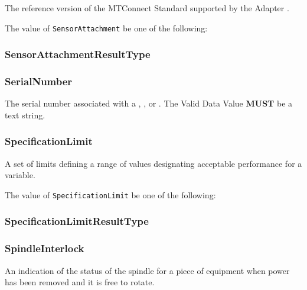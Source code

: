 The reference version of the MTConnect Standard supported by the \gls{Adapter}
.


The value of \texttt{SensorAttachment} \MUST be one of the following: 

\FloatBarrier

\subsubsection{SensorAttachmentResultType}
\label{sec:SensorAttachmentResultType}






\subsubsection{SerialNumber}
\label{sec:SerialNumber}



The serial number associated with a , , or . The \gls{Valid Data Value} \textbf{MUST} be a text string.


\subsubsection{SpecificationLimit}
\label{sec:SpecificationLimit}



A set of limits defining a range of values designating acceptable performance for a variable.


The value of \texttt{SpecificationLimit} \MUST be one of the following: 

\FloatBarrier

\subsubsection{SpecificationLimitResultType}
\label{sec:SpecificationLimitResultType}






\subsubsection{SpindleInterlock}
\label{sec:SpindleInterlock}



An indication of the status of the spindle for a piece of equipment when power has been removed and it is free to rotate.


